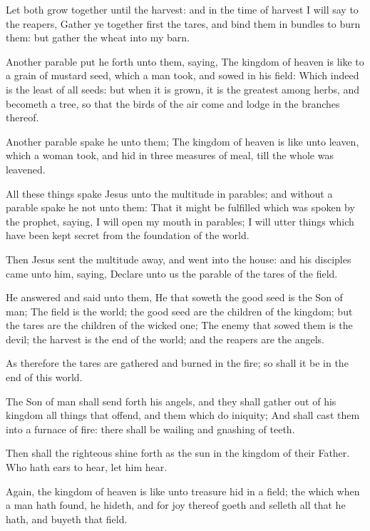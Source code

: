 \Verse Let both grow together until the harvest: and in the time of harvest I will say to the reapers, Gather ye together first the tares, and bind them in bundles to burn them: but gather the wheat into my barn.

\Verse Another parable put he forth unto them, saying, The kingdom of heaven is like to a grain of mustard seed, which a man took, and sowed in his field: \Verse Which indeed is the least of all seeds: but when it is grown, it is the greatest among herbs, and becometh a tree, so that the birds of the air come and lodge in the branches thereof.

\Verse Another parable spake he unto them; The kingdom of heaven is like unto leaven, which a woman took, and hid in three measures of meal, till the whole was leavened.

\Verse All these things spake Jesus unto the multitude in parables; and without a parable spake he not unto them: \Verse That it might be fulfilled which was spoken by the prophet, saying, I will open my mouth in parables; I will utter things which have been kept secret from the foundation of the world.

\Verse Then Jesus sent the multitude away, and went into the house: and his disciples came unto him, saying, Declare unto us the parable of the tares of the field.

\Verse He answered and said unto them, He that soweth the good seed is the Son of man; \Verse The field is the world; the good seed are the children of the kingdom; but the tares are the children of the wicked one; \Verse The enemy that sowed them is the devil; the harvest is the end of the world; and the reapers are the angels.

\Verse As therefore the tares are gathered and burned in the fire; so shall it be in the end of this world.

\Verse The Son of man shall send forth his angels, and they shall gather out of his kingdom all things that offend, and them which do iniquity; \Verse And shall cast them into a furnace of fire: there shall be wailing and gnashing of teeth.

\Verse Then shall the righteous shine forth as the sun in the kingdom of their Father. Who hath ears to hear, let him hear.

\Verse Again, the kingdom of heaven is like unto treasure hid in a field; the which when a man hath found, he hideth, and for joy thereof goeth and selleth all that he hath, and buyeth that field.

